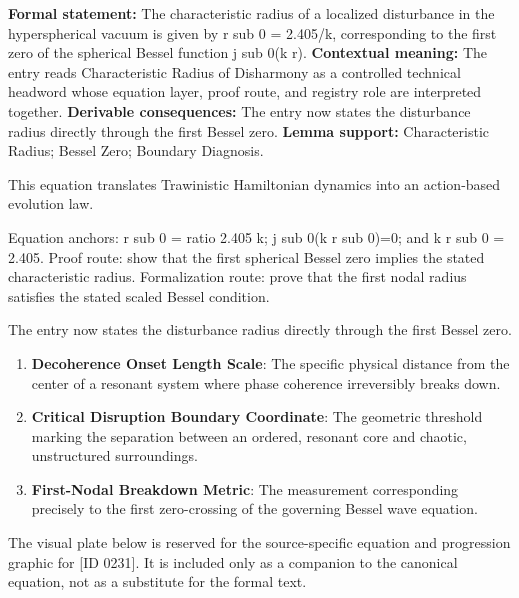 \begingroup\footnotesize\setlength{\emergencystretch}{3em}\sloppy
\textbf{Formal statement:} The characteristic radius of a localized disturbance in the hyperspherical vacuum is given by r sub 0 = 2.405/k, corresponding to the first zero of the spherical Bessel function j sub 0(k r). \textbf{Contextual meaning:} The entry reads Characteristic Radius of Disharmony as a controlled technical headword whose equation layer, proof route, and registry role are interpreted together. \textbf{Derivable consequences:} The entry now states the disturbance radius directly through the first Bessel zero. \textbf{Lemma support:} Characteristic Radius; Bessel Zero; Boundary Diagnosis.\par
\endgroup

This equation translates Trawinistic Hamiltonian dynamics into an action-based evolution law.

Equation anchors: r sub 0 = ratio 2.405 k; j sub 0(k r sub 0)=0; and k r sub 0 = 2.405. Proof route: show that the first spherical Bessel zero implies the stated characteristic radius. Formalization route: prove that the first nodal radius satisfies the stated scaled Bessel condition.

The entry now states the disturbance radius directly through the first Bessel zero.
\endgroup

\begin{enumerate}[leftmargin=1.6em,itemsep=6pt,topsep=4pt]
\item \textbf{Decoherence Onset Length Scale}: The specific physical distance from the center of a resonant system where phase coherence irreversibly breaks down.
\item \textbf{Critical Disruption Boundary Coordinate}: The geometric threshold marking the separation between an ordered, resonant core and chaotic, unstructured surroundings.
\item \textbf{First-Nodal Breakdown Metric}: The measurement corresponding precisely to the first zero-crossing of the governing Bessel wave equation.
\end{enumerate}

\begingroup\footnotesize\sloppy
The visual plate below is reserved for the source-specific equation and progression graphic for [ID 0231]. It is included only as a companion to the canonical equation, not as a substitute for the formal text.
\par\endgroup
\ifTZPDarkEdition
{}
\fi

